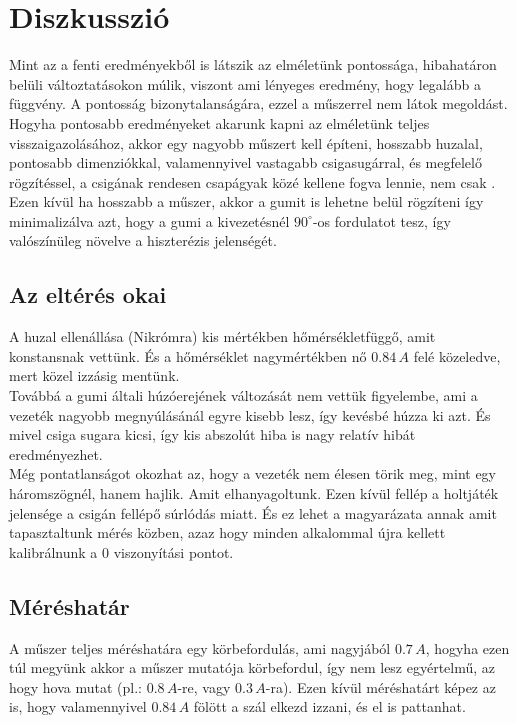 \documentclass[a4paper, 10pt, oneside]{article}
\begin{document}

\section{Diszkusszió}

Mint az a fenti eredményekből is látszik az elméletünk pontossága, hibahatáron belüli változtatásokon 
múlik, viszont ami lényeges eredmény, hogy legalább  a függvény. A pontosság bizonytalanságára,
 ezzel a műszerrel nem látok megoldást. Hogyha pontosabb eredményeket akarunk kapni az elméletünk 
teljes visszaigazolásához, akkor egy nagyobb műszert kell építeni, hosszabb huzalal, pontosabb dimenziókkal, 
valamennyivel vastagabb csigasugárral, és megfelelő rögzítéssel, a csigának rendesen csapágyak közé kellene fogva lennie,
nem csak . Ezen kívül ha hosszabb a műszer, akkor a gumit is lehetne belül rögzíteni így minimalizálva
azt, hogy a gumi a kivezetésnél $90^\circ$-os fordulatot tesz, így valószínüleg növelve a hiszterézis jelenségét.

\subsection{Az eltérés okai}

A huzal ellenállása (Nikrómra) kis mértékben hőmérsékletfüggő, amit konstansnak vettünk. És a hőmérséklet 
nagymértékben nő $0.84\, A$ felé közeledve, mert közel izzásig mentünk.\\
\indent Továbbá a gumi általi húzóerejének 
változását nem vettük figyelembe, ami a vezeték nagyobb megnyúlásánál egyre kisebb lesz, így kevésbé húzza 
ki azt. És mivel csiga sugara kicsi, így kis abszolút hiba is nagy relatív hibát eredményezhet.\\
\indent Még pontatlanságot okozhat az, hogy a vezeték nem élesen törik meg, mint egy háromszögnél, hanem hajlik. Amit 
elhanyagoltunk. Ezen kívül fellép a holtjáték jelensége a csigán fellépő súrlódás miatt. És ez lehet a 
magyarázata annak amit tapasztaltunk mérés közben, azaz hogy minden alkalommal újra kellett kalibrálnunk 
a 0 viszonyítási pontot.\smallskip 

\subsection{Méréshatár}

A műszer teljes méréshatára egy körbefordulás, ami nagyjából $0.7\, A$, hogyha ezen túl megyünk akkor a műszer 
mutatója körbefordul, így nem lesz egyértelmű, az hogy hova mutat (pl.: $0.8\, A$-re, vagy $0.3\, A$-ra). Ezen
kívül méréshatárt képez az is, hogy valamennyivel $0.84\, A$ fölött a szál elkezd izzani, és el is pattanhat.
\end{document}
